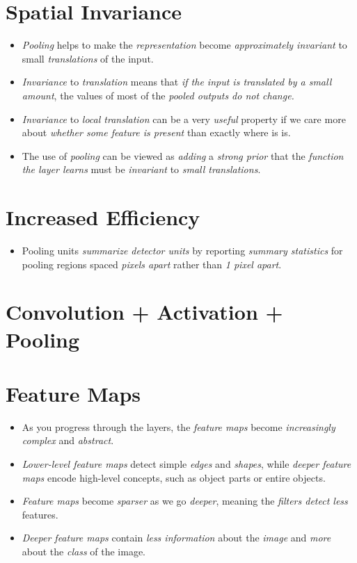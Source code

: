 \documentclass[
	number={9},
	title={Convolutional Neural Network}
]{cs584notes}
\begin{document}
\section{Spatial Invariance}\label{sec:spatial-invariance}
\begin{itemize}
	\item \emph{Pooling} helps to make the \emph{representation} become \emph{approximately invariant} to small \emph{translations} of the input.
	\item \emph{Invariance} to \emph{translation} means that \emph{if the input is translated by a small amount}, the values of most of the \emph{pooled outputs do not change.}
	\item \emph{Invariance} to \emph{local translation} can be a very \emph{useful} property if we care more about \emph{whether some feature is present} than exactly where is is.
	\item The use of \emph{pooling} can be viewed as \emph{adding} a \emph{strong prior} that the \emph{function the layer learns} must be \emph{invariant} to \emph{small translations}.
\end{itemize}

\section{Increased Efficiency}\label{sec:increased-efficiency}
\begin{itemize}
	\item Pooling units \emph{summarize detector units} by reporting \emph{summary statistics} for pooling regions spaced  \emph{pixels apart} rather than \emph{1 pixel apart}.
\end{itemize}

\section{Convolution + Activation + Pooling}\label{sec:convolution-+-activation-+-pooling}

\section{Feature Maps}\label{sec:feature-maps}
\begin{itemize}
	\item As you progress through the layers, the \emph{feature maps} become \emph{increasingly complex} and \emph{abstract}.
	\item \emph{Lower-level feature maps} detect simple \emph{edges} and \emph{shapes}, while \emph{deeper feature maps} encode high-level concepts, such as object parts or entire objects.
	\item \emph{Feature maps} become \emph{sparser} as we go \emph{deeper}, meaning the \emph{filters detect less} features.
	\item \emph{Deeper feature maps} contain \emph{less information} about the \emph{image} and \emph{more} about the \emph{class} of the image.
\end{itemize}
\end{document}

